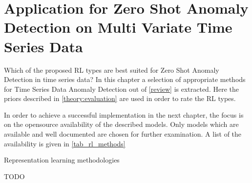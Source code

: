 \section{Application for Zero Shot Anomaly Detection on Multi Variate Time Series Data}\label{application}
 Which of the proposed RL types are best suited for Zero Shot Anomaly Detection in time series data? In this chapter a selection of appropriate methods for Time Series Data Anomaly Detection out of \ref{review} is extracted. Here the priors described in \ref{theory:evaluation} are used in order to rate the RL types.

 In order to achieve a successful implementation in the next chapter, the focus is on the opensource availability of the described models. Only models which are available and well documented are chosen for further examination. A list of the availability is given in \ref{tab_rl_methods}
 \begin{table}
   \caption{Representation learning methodologies}\label{tab_rl_methods}
   
 \end{table}
TODO \cite{fung_model_2024}  %
